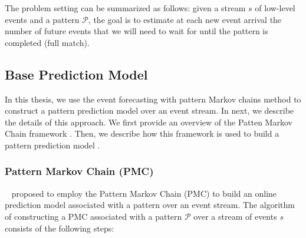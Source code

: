 \par The problem setting can be summarized as follows: given a stream $s$ of low-level events and a pattern $\mathcal{P}$, 
the goal is to estimate at each new event arrival the number of future events
that we will need to wait for until the pattern is completed (full match).

\subsection{Base Prediction Model}
\label{sec:Event-Forecasting-PMC}

\par In this thesis, we use the event forecasting with pattern Markov chains method \cite{alevizos2017event} to construct a pattern prediction model over an event stream. In next, we describe the details of this approach. We first provide an overview of the Patten Markov Chain framework \cite{nuel_pattern_2008}. Then, we describe how this framework is used to build a pattern prediction model \cite{alevizos2017event}.  


\subsubsection*{Pattern Markov Chain (PMC)}

~\citet{alevizos2017event} proposed to employ the Pattern Markov Chain (PMC) \cite{nuel_pattern_2008} to build an online prediction model associated with a pattern over an event stream. The algorithm of constructing a PMC associated with a pattern $\mathcal{P}$ over a stream of events $s$ consists of the following steps:

